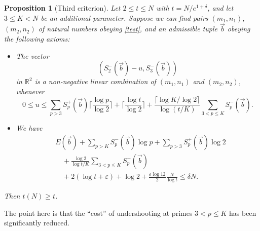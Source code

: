\documentclass[12pt,a4paper,reqno]{amsart}
\numberwithin{equation}{section}
\theoremstyle{plain}
\newtheorem{proposition}[theorem]{Proposition}
\theoremstyle{definition}
\newcommand\R{\mathbb{R}}
\newcommand\eps{\varepsilon}
\begin{document}
\begin{proposition}[Third criterion]  Let $2 \leq t \leq N$ with $t = N /e^{1+\delta}$, and let $3 \leq K < N$ be an additional parameter.  Suppose we can find pairs $(m_1,n_1)$, $(m_2,n_2)$ of natural numbers obeying \eqref{test}, and an admissible tuple $\vec b$ obeying the following axioms:
  \begin{itemize}
    \item[(i)]  The vector
  \begin{equation}\label{svec-2}
    (S^-_2(\vec b)-u, S^-_3(\vec b))
  \end{equation}
  in $\R^2$ is a non-negative linear combination of $(m_1,n_1)$ and $(m_2,n_2)$, whenever
  $$ 0 \leq u \leq \sum_{p>3} S^+_p(\vec b) \lceil \frac{\log p}{\log 2} \rceil + \lceil \frac{\log t}{\log 2} \rceil + \frac{\lceil \log K/\log 2\rceil}{\log(t/K)} \sum_{3 < p \leq K} S^-_p(\vec b).$$
    \item[(ii)]  We have
    \begin{equation}\label{main-3}
      \begin{split} 
  &    E(\vec b) + \sum_{p>K} S^-_p(\vec b) \log p + \sum_{p>3} S^+_p(\vec b) \log 2 \\
  & \quad + \frac{\log 2}{\log t/K} \sum_{3 < p \leq K} S^-_p(\vec b) \\
  & \quad + 2(\log t + \eps) + \log 2 + \frac{\eps \log 12}{2} \frac{N}{\log t} \leq \delta N.
      \end{split}
    \end{equation}
  \end{itemize}
  Then $t(N) \geq t$.
  \end{proposition}
  
The point here is that the ``cost'' of undershooting at primes $3 < p \leq K$ has been significantly reduced.
\end{document}
